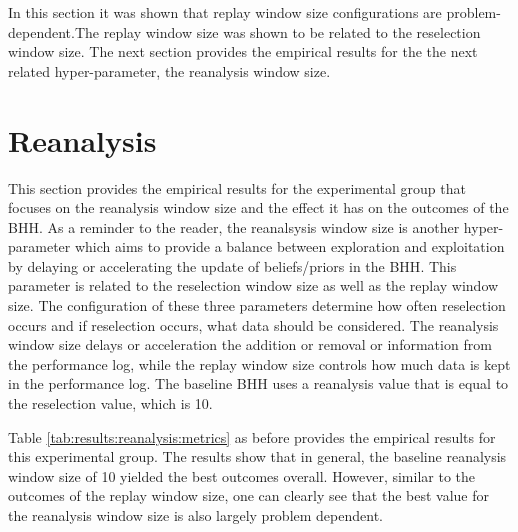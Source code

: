 In this section it was shown that replay window size configurations are problem-dependent.The replay window size was shown to be related to the reselection window size. The next section provides the empirical results for the the next related hyper-parameter, the reanalysis window size.







\section{Reanalysis}
\label{sec:results:reanalysis}

This section provides the empirical results for the experimental group that focuses on the reanalysis window size and the effect it has on the outcomes of the \Ac{BHH}. As a reminder to the reader, the reanalsysis window size is another hyper-parameter which aims to provide a balance between exploration and exploitation by delaying or accelerating the update of beliefs/priors in the \Ac{BHH}. This parameter is related to the reselection window size as well as the replay window size. The configuration of these three parameters determine how often reselection occurs and if reselection occurs, what data should be considered. The reanalysis window size delays or acceleration the addition or removal or information from the performance log, while the replay window size controls how much data is kept in the performance log. The baseline \Ac{BHH} uses a reanalysis value that is equal to the reselection value, which is 10.

Table \ref{tab:results:reanalysis:metrics} as before provides the empirical results for this experimental group. The results show that in general, the baseline reanalysis window size of 10 yielded the best outcomes overall. However, similar to the outcomes of the replay window size, one can clearly see that the best value for the reanalysis window size is also largely problem dependent.

